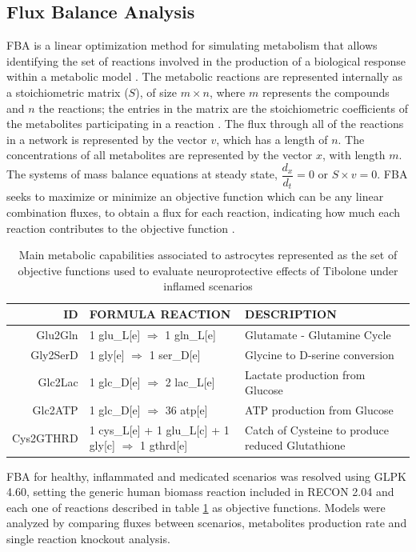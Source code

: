 \subsection*{Flux Balance Analysis}
FBA is a linear optimization method for simulating metabolism that allows identifying the set of reactions involved in the production of a biological response within a metabolic model \cite{Orth2010}. The metabolic reactions are represented internally as a stoichiometric matrix ($S$), of size $m \times n$, where $m$ represents the compounds and $n$ the reactions; the entries in the matrix are the stoichiometric coefficients of the metabolites participating in a reaction \cite{Raman2009}. The flux through all of the reactions in a network is represented by the vector $v$, which has a length of $n$. The concentrations of all metabolites are represented by the vector $x$, with length $m$. The systems of mass balance equations at steady state, $\dfrac{d_{x}}{d_{t}}=0$ or $S \times v = 0$. FBA seeks to maximize or minimize an objective function which can be any linear combination fluxes, to obtain a flux for each reaction, indicating how much each reaction contributes to the objective function \cite{Orth2010}.

\begin{table}[h]
\caption{Main metabolic capabilities associated to astrocytes represented as the set of objective functions used to evaluate neuroprotective effects of Tibolone under inflamed scenarios}
\label{OF}
\begin{center}
\begin{tabular}{rm{6.5cm}m{6cm}}
\hline
ID & FORMULA REACTION & DESCRIPTION \\
\hline
\hline
Glu2Gln & 1 glu\_L[e] $\Rightarrow$ 1 gln\_L[e] & Glutamate - Glutamine Cycle \\
Gly2SerD & 1 gly[e] $\Rightarrow$ 1 ser\_D[e] & Glycine to D-serine conversion\\
Glc2Lac & 1 glc\_D[e] $\Rightarrow$ 2 lac\_L[e]& Lactate production from Glucose \\
Glc2ATP & 1 glc\_D[e] $\Rightarrow$ 36 atp[e] & ATP production from Glucose \\
Cys2GTHRD&1 cys\_L[e] + 1 glu\_L[c] + 1 gly[c] $\Rightarrow$ 1 gthrd[e]& Catch of Cysteine to produce reduced Glutathione \\
\hline
\end{tabular}
\end{center}
\end{table} 

FBA for healthy, inflammated and medicated scenarios was resolved using GLPK 4.60, setting the generic human biomass reaction included in RECON 2.04 and each one of reactions described in table \ref{OF} as objective functions. Models were analyzed by comparing fluxes between scenarios, metabolites production rate and single reaction knockout analysis.
